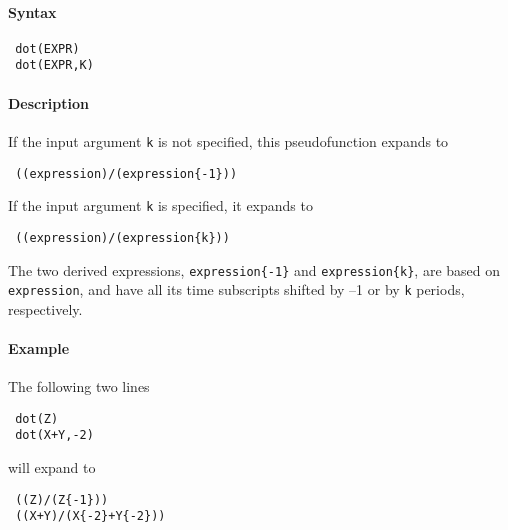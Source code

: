 


	\paragraph{Syntax}
 
 \begin{verbatim}
 dot(EXPR)
 dot(EXPR,K)
 \end{verbatim}
 
 \paragraph{Description}
 
 If the input argument \texttt{k} is not specified, this pseudofunction
 expands to
 
 \begin{verbatim}
 ((expression)/(expression{-1}))
 \end{verbatim}
 
 If the input argument \texttt{k} is specified, it expands to
 
 \begin{verbatim}
 ((expression)/(expression{k}))
 \end{verbatim}
 
 The two derived expressions, \texttt{expression\{-1\}} and
 \texttt{expression\{k\}}, are based on \texttt{expression}, and have all
 its time subscripts shifted by --1 or by \texttt{k} periods,
 respectively.
 
 \paragraph{Example}
 
 The following two lines
 
 \begin{verbatim}
 dot(Z)
 dot(X+Y,-2)
 \end{verbatim}
 
 will expand to
 
 \begin{verbatim}
 ((Z)/(Z{-1}))
 ((X+Y)/(X{-2}+Y{-2}))
 \end{verbatim}


